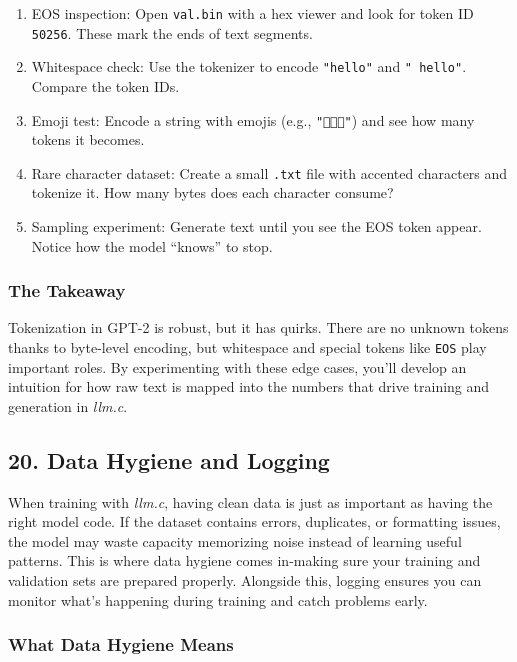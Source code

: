 \documentclass[
  letterpaper,
  DIV=11,
  numbers=noendperiod]{scrreprt}
\providecommand{\tightlist}{%
  \setlength{\itemsep}{0pt}\setlength{\parskip}{0pt}}
\begin{document}
\begin{enumerate}
\def\labelenumi{\arabic{enumi}.}
\tightlist
\item
  EOS inspection: Open \texttt{val.bin} with a hex viewer and look for
  token ID \texttt{50256}. These mark the ends of text segments.
\item
  Whitespace check: Use the tokenizer to encode \texttt{"hello"} and
  \texttt{"\ hello"}. Compare the token IDs.
\item
  Emoji test: Encode a string with emojis (e.g., \texttt{"🙂🙂🙂"}) and
  see how many tokens it becomes.
\item
  Rare character dataset: Create a small \texttt{.txt} file with
  accented characters and tokenize it. How many bytes does each
  character consume?
\item
  Sampling experiment: Generate text until you see the EOS token appear.
  Notice how the model ``knows'' to stop.
\end{enumerate}

\subsubsection{The Takeaway}\label{the-takeaway-8}

Tokenization in GPT-2 is robust, but it has quirks. There are no unknown
tokens thanks to byte-level encoding, but whitespace and special tokens
like \texttt{EOS} play important roles. By experimenting with these edge
cases, you'll develop an intuition for how raw text is mapped into the
numbers that drive training and generation in \emph{llm.c}.

\subsection{20. Data Hygiene and
Logging}\label{data-hygiene-and-logging}

When training with \emph{llm.c}, having clean data is just as important
as having the right model code. If the dataset contains errors,
duplicates, or formatting issues, the model may waste capacity
memorizing noise instead of learning useful patterns. This is where data
hygiene comes in-making sure your training and validation sets are
prepared properly. Alongside this, logging ensures you can monitor
what's happening during training and catch problems early.

\subsubsection{What Data Hygiene Means}\label{what-data-hygiene-means}
\end{document}
